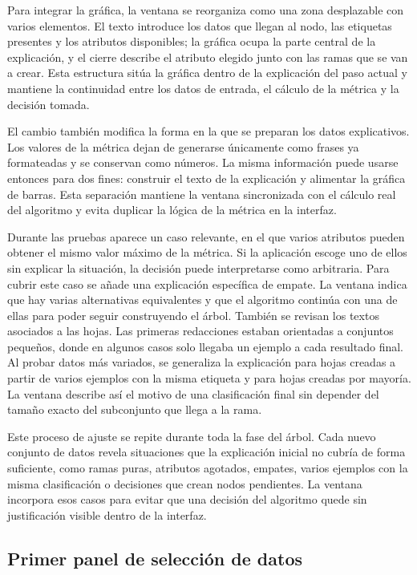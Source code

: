 Para integrar la gráfica, la ventana se reorganiza como una zona desplazable con varios elementos.
El texto introduce los datos que llegan al \gls{nodo}, las etiquetas presentes y los atributos disponibles; la gráfica ocupa la parte central de la explicación, y el cierre describe el atributo elegido junto con las ramas que se van a crear.
Esta estructura sitúa la gráfica dentro de la explicación del paso actual y mantiene la continuidad entre los datos de entrada, el cálculo de la métrica y la decisión tomada.

El cambio también modifica la forma en la que se preparan los datos explicativos.
Los valores de la métrica dejan de generarse únicamente como frases ya formateadas y se conservan como números.
La misma información puede usarse entonces para dos fines: construir el texto de la explicación y alimentar la gráfica de barras.
Esta separación mantiene la ventana sincronizada con el cálculo real del algoritmo y evita duplicar la lógica de la métrica en la interfaz.

Durante las pruebas aparece un caso relevante, en el que varios atributos pueden obtener el mismo valor máximo de la métrica.
Si la aplicación escoge uno de ellos sin explicar la situación, la decisión puede interpretarse como arbitraria.
Para cubrir este caso se añade una explicación específica de empate.
La ventana indica que hay varias alternativas equivalentes y que el algoritmo continúa con una de ellas para poder seguir construyendo el árbol.
También se revisan los textos asociados a las hojas.
Las primeras redacciones estaban orientadas a conjuntos pequeños, donde en algunos casos solo llegaba un ejemplo a cada resultado final.
Al probar datos más variados, se generaliza la explicación para hojas creadas a partir de varios ejemplos con la misma etiqueta y para hojas creadas por mayoría.
La ventana describe así el motivo de una clasificación final sin depender del tamaño exacto del subconjunto que llega a la rama.

Este proceso de ajuste se repite durante toda la fase del árbol.
Cada nuevo conjunto de datos revela situaciones que la explicación inicial no cubría de forma suficiente, como ramas puras, atributos agotados, empates, varios ejemplos con la misma clasificación o decisiones que crean \gls{nodo}s pendientes.
La ventana incorpora esos casos para evitar que una decisión del algoritmo quede sin justificación visible dentro de la interfaz.


\subsection{Primer panel de selección de datos}

